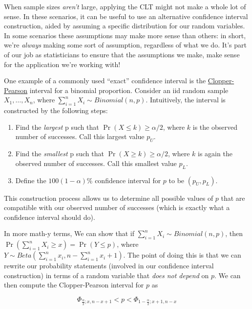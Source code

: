 \documentclass[
  letterpaper,
  DIV=11,
  numbers=noendperiod]{scrreprt}
\begin{document}
When sample sizes \emph{aren't} large, applying the CLT might not make a
whole lot of sense. In these scenarios, it can be useful to use an
alternative confidence interval construction, aided by assuming a
specific distribution for our random variables. In some scenarios these
assumptions may make more sense than others: in short, we're
\emph{always} making some sort of assumption, regardless of what we do.
It's part of our job as statisticians to ensure that the assumptions we
make, make sense for the application we're working with!

One example of a commonly used ``exact'' confidence interval is the
\href{https://en.wikipedia.org/wiki/Binomial_proportion_confidence_interval\#Clopper\%E2\%80\%93Pearson_interval}{Clopper-Pearson}
interval for a binomial proportion. Consider an iid random sample
\(X_1, \dots, X_n\), where \(\sum_{i = 1}^n X_i \sim Binomial(n, p)\).
Intuitively, the interval is constructed by the following steps:

\begin{enumerate}
\def\labelenumi{\arabic{enumi}.}
\item
  Find the \emph{largest} p such that \(\Pr(X \leq k) \geq \alpha/2\),
  where \(k\) is the observed number of successes. Call this largest
  value \(p_U\).
\item
  Find the \emph{smallest} p such that \(\Pr(X \geq k) \geq \alpha/2\),
  where \(k\) is again the observed number of successes. Call this
  smallest value \(p_L\).
\item
  Define the \(100(1 -\alpha)\)\% confidence interval for \(p\) to be
  \((p_U, p_L)\).
\end{enumerate}

This construction process allows us to determine all possible values of
\(p\) that are compatible with our observed number of successes (which
is exactly what a confidence interval should do).

In more math-y terms, We can show that if
\(\sum_{i = 1}^n X_i \sim Binomial(n, p)\), then
\(\Pr(\sum_{i = 1}^n X_i \geq x) = \Pr(Y \leq p)\), where
\(Y \sim Beta(\sum_{i = 1}^n x_i, n - \sum_{i = 1}^n x_i + 1)\). The
point of doing this is that we can rewrite our probability statements
(involved in our confidence interval construction) in terms of a random
variable that \emph{does not depend} on \(p\). We can then compute the
Clopper-Pearson interval for \(p\) as

\[
\Phi_{\frac{\alpha}{2}; x, n - x + 1} < p < \Phi_{1 - \frac{\alpha}{2}; x + 1, n - x}
\]
\end{document}
